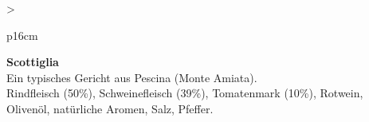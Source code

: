 \documentclass[
  beamerpaper,
  DIV=11,
  numbers=noendperiod,
  aspectratio=54]{scrreprt}
\begin{document}
\begin{table}

\caption{\label{tbl-panel-primi2}Suppe}\begin{minipage}[t]{\linewidth}

\tabularnewline

\fontsize{16}{18}\selectfont
\begin{tabular}{>{\raggedright\arraybackslash}p{16cm}}
\toprule
\begingroup\fontsize{18}{20}\selectfont \textbf{Scottiglia}\endgroup\\
\midrule
Ein typisches Gericht aus Pescina (Monte Amiata).\\
Rindfleisch (50\%), Schweinefleisch (39\%), Tomatenmark (10\%), Rotwein, Olivenöl, natürliche Aromen, Salz, Pfeffer.\\
\bottomrule
\end{tabular}

\end{minipage}%
\newline
\begin{minipage}[t]{\linewidth}


\end{minipage}%

\end{table}
\end{document}
